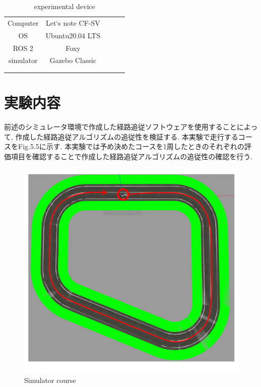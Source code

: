 \begin{table}[H]
  \centering
  \caption{experimental device}
  \begin{tabular}{cclll}
  \cline{1-2}
  Computer             & Let`s note CF-SV &  &  &  \\
  OS                   & Ubuntu20.04 LTS  &  &  &  \\
  ROS 2                & Foxy             &  &  &  \\
  simulator            & Gazebo Classic   &  &  &  \\
  \multicolumn{1}{l}{} &                  &  &  &  \\
  \multicolumn{1}{l}{} &                  &  &  & 
  \end{tabular}
\end{table}

\section{実験内容}
前述のシミュレータ環境で作成した経路追従ソフトウェアを使用することによって, 作成した経路追従アルゴリズムの追従性を検証する.
本実験で走行するコースをFig.5.5に示す.
本実験では予め決めたコースを1周したときのそれぞれの評価項目を確認することで作成した経路追従アルゴリズムの追従性の確認を行う.

\begin{figure}[H]
  \centering
 \includegraphics[keepaspectratio, scale=0.55]
      {images/simulatorpath.png}
 \caption{Simulator course}
 \label{fig:simulator}
\end{figure}

